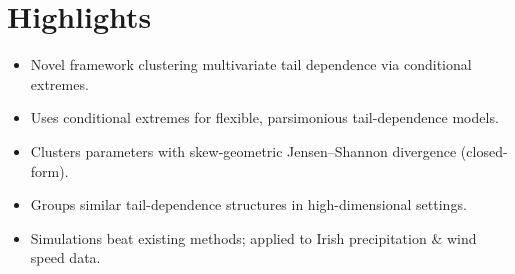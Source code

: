 \documentclass{article}
\begin{document}
\section*{Highlights}

\begin{itemize}
    \item Novel framework clustering multivariate tail dependence via conditional extremes.
    \item Uses conditional extremes for flexible, parsimonious tail-dependence models.
    \item Clusters parameters with skew-geometric Jensen--Shannon divergence (closed-form).
    \item Groups similar tail-dependence structures in high-dimensional settings.
    \item Simulations beat existing methods; applied to Irish precipitation \& wind speed data.
\end{itemize}
\end{document}
